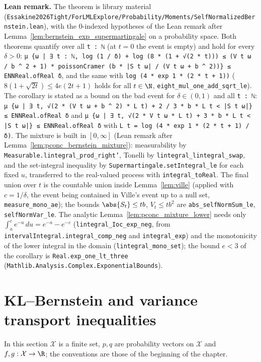 \textbf{Lean remark.} The theorem is library material
(\texttt{Essakine2026Tight/ForLMLExplore/Probability/Moments/SelfNormalizedBernstein.lean}), with the
$0$-indexed hypotheses of the Lean remark after Lemma~\ref{lem:bernstein_exp_supermartingale}
on a probability space. Both theorems quantify over all \texttt{t : ℕ} (at $t = 0$ the event is
empty) and hold for every $\delta > 0$:
\texttt{μ \{ω | ∃ t : ℕ, log (1 / δ) + log (8 * (1 + √(2 * t))) ≤ (V t ω / b \^{} 2 + 1) *
poissonCramer (b * |S t ω| / (V t ω + b \^{} 2))\} ≤ ENNReal.ofReal δ}, and the same with
\texttt{log (4 * exp 1 * (2 * t + 1))} ($8(1 + \sqrt{2t}) \le 4e(2t + 1)$ holds for all $t \in \N$,
\texttt{eight\_mul\_one\_add\_sqrt\_le}). The corollary is stated as a bound on the bad event for
$\delta \in (0, 1)$ and all \texttt{t : ℕ}:
\texttt{μ \{ω | ∃ t, √(2 * (V t ω + b \^{} 2) * L t) + 2 / 3 * b * L t < |S t ω|\} ≤ ENNReal.ofReal δ}
and \texttt{μ \{ω | ∃ t, √(2 * V t ω * L t) + 3 * b * L t < |S t ω|\} ≤ ENNReal.ofReal δ} with
\texttt{L t = log (4 * exp 1 * (2 * t + 1) / δ)}.
The mixture is built in $[0, \infty]$ (Lean remark after
Lemma~\ref{lem:pconc_bernstein_mixture}): measurability by \texttt{Measurable.lintegral\_prod\_right'},
Tonelli by \texttt{lintegral\_lintegral\_swap}, and the set-integral inequality by
\texttt{Supermartingale.setIntegral\_le} for each fixed $u$, transferred to the real-valued
process with \texttt{integral\_toReal}. The final union over $t$ is the countable union inside
Lemma~\ref{lem:ville} (applied with $c = 1/\delta$, the event being contained in Ville's event up to
a null set, \texttt{measure\_mono\_ae}); the bounds $\abs{S_t} \le tb$, $V_t \le tb^2$ are
\texttt{abs\_selfNormSum\_le}, \texttt{selfNormVar\_le}. The analytic
Lemma~\ref{lem:pconc_mixture_lower} needs only $\int_a^{c} e^{-u}\,du = e^{-a} - e^{-c}$
(\texttt{lintegral\_Ioc\_exp\_neg}, from \texttt{intervalIntegral.integral\_comp\_neg} and
\texttt{integral\_exp}) and the monotonicity of the lower integral in the domain
(\texttt{lintegral\_mono\_set}); the bound $e < 3$ of the corollary is
\texttt{Real.exp\_one\_lt\_three} (\texttt{Mathlib.Analysis.Complex.ExponentialBounds}).

\section{KL--Bernstein and variance transport inequalities}
\label{sec:pconc_kl}

In this section $\mathcal X$ is a finite set, $p, q$ are probability vectors on $\mathcal X$ and
$f, g : \mathcal X \to \R$; the conventions are those of the beginning of the chapter.

